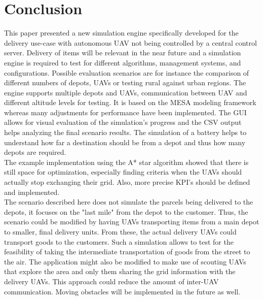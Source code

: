 \section{Conclusion}\label{sec:conclusion}
This paper presented a new simulation engine specifically developed for the 
delivery use-case with autonomous UAV not being controlled by a central control 
server. Delivery of items will be relevant in the near future and a simulation 
engine is required to test for different algorithms, management systems, and 
configurations. Possible evaluation scenarios are for instance the comparison 
of different numbers of depots, UAVs or testing rural against urban regions. 
The 
engine supports multiple depots and 
UAVs, communication between UAV and different altitude levels for testing. It 
is based on the MESA modeling framework whereas many adjustments for 
performance have been implemented. The GUI allows for visual evaluation of the 
simulation's progress and the CSV output helps analyzing the final scenario 
results. The simulation of a battery helps to understand how far a destination 
should be from a depot and thus how many depots are required. \\
The example implementation using the A* star algorithm showed that there is still space for optimization, especially finding criteria when the UAVs should actually stop exchanging their grid. Also, more precise KPI's should be defined and implemented.\\
The scenario described here does not simulate the parcels being delivered to 
the depots, it focuses on the "last mile" from the depot to the customer. Thus, 
the scenario could be modified by having UAVs transporting items from a main 
depot to smaller, final delivery units. From these, the actual delivery UAVs 
could transport goods to the customers. Such a simulation allows to test for 
the feasibility of taking the intermediate transportation of goods from the 
street to the air. The application might also be modified to make use of 
scouting UAVs that explore the area and only them sharing the grid information 
with the delivery UAVs. This approach could reduce the amount of inter-UAV 
communication. Moving obstacles will be implemented in the future as well.
